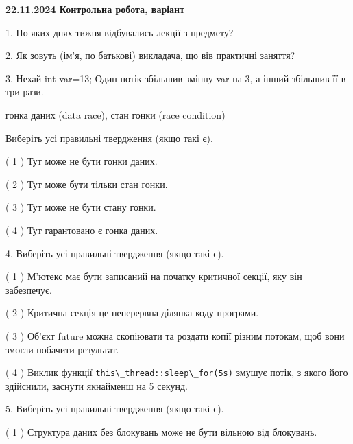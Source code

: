 \documentclass[12pt, ukrainian]{article}
\def\code#1{\Verb!#1!}
\begin{document}
\vspace{4mm}
\newpage
\begin {large}

\textbf{22.11.2024 Контрольна робота, варіант  }\par


{
1. По яких днях тижня відбувались лекції з предмету?



\vspace{5mm}
2. Як зовуть (ім'я, по батькові) викладача, що вів практичні заняття?



\vspace{5mm}
3. Нехай int var=13; Один потік збільшив змінну var на 3, а інший збільшив її в три рази.

гонка даних (data race), стан гонки (race condition)

Виберіть усі правильні твердження (якщо такі є).\par
\vspace{2mm}
( 1 ) Тут може не бути гонки даних.%

( 2 ) Тут може бути тільки стан гонки.%

( 3 ) Тут може не бути стану гонки.%

( 4 ) Тут гарантовано є гонка даних.%


\vspace{5mm}
4. Виберіть усі правильні твердження (якщо такі є).\par
\vspace{2mm}

( 1 ) М’ютекс має бути записаний на початку критичної секції, яку він забезпечує.%

( 2 ) Критична секція це неперервна ділянка коду програми.%

( 3 ) Об’єкт future можна скопіювати та роздати копії різним потокам, щоб вони змогли побачити результат.%

( 4 ) Виклик функції \code{this\_thread::sleep\_for(5s)} змушує потік, з якого його здійснили, заснути якнайменш на 5 секунд.%


\vspace{5mm}
5. Виберіть усі правильні твердження (якщо такі є).\par
\vspace{2mm}

( 1 ) Структура даних без блокувань може не бути вільною від блокувань.%

}
\end{large}
\end{document}
